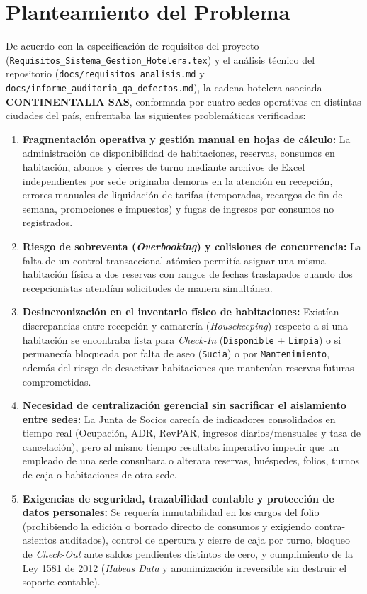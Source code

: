 \documentclass[12pt,a4paper]{article}
\begin{document}
\section{Planteamiento del Problema}

De acuerdo con la especificaci\'on de requisitos del proyecto (\texttt{Requisitos\_Sistema\_Gestion\_Hotelera.tex}) y el an\'alisis t\'ecnico del repositorio (\texttt{docs/requisitos\_analisis.md} y \texttt{docs/informe\_auditoria\_qa\_defectos.md}), la cadena hotelera asociada \textbf{CONTINENTALIA SAS}, conformada por cuatro sedes operativas en distintas ciudades del pa\'is, enfrentaba las siguientes problem\'aticas verificadas:

\begin{enumerate}
    \item \textbf{Fragmentaci\'on operativa y gesti\'on manual en hojas de c\'alculo:} La administraci\'on de disponibilidad de habitaciones, reservas, consumos en habitaci\'on, abonos y cierres de turno mediante archivos de Excel independientes por sede originaba demoras en la atenci\'on en recepci\'on, errores manuales de liquidaci\'on de tarifas (temporadas, recargos de fin de semana, promociones e impuestos) y fugas de ingresos por consumos no registrados.
    \item \textbf{Riesgo de sobreventa (\textit{Overbooking}) y colisiones de concurrencia:} La falta de un control transaccional at\'omico permit\'ia asignar una misma habitaci\'on f\'isica a dos reservas con rangos de fechas traslapados cuando dos recepcionistas atend\'ian solicitudes de manera simult\'anea.
    \item \textbf{Desincronizaci\'on en el inventario f\'isico de habitaciones:} Exist\'ian discrepancias entre recepci\'on y camarer\'ia (\textit{Housekeeping}) respecto a si una habitaci\'on se encontraba lista para \textit{Check-In} (\texttt{Disponible} + \texttt{Limpia}) o si permanec\'ia bloqueada por falta de aseo (\texttt{Sucia}) o por \texttt{Mantenimiento}, adem\'as del riesgo de desactivar habitaciones que manten\'ian reservas futuras comprometidas.
    \item \textbf{Necesidad de centralizaci\'on gerencial sin sacrificar el aislamiento entre sedes:} La Junta de Socios carec\'ia de indicadores consolidados en tiempo real (Ocupaci\'on, ADR, RevPAR, ingresos diarios/mensuales y tasa de cancelaci\'on), pero al mismo tiempo resultaba imperativo impedir que un empleado de una sede consultara o alterara reservas, hu\'espedes, folios, turnos de caja o habitaciones de otra sede.
    \item \textbf{Exigencias de seguridad, trazabilidad contable y protecci\'on de datos personales:} Se requer\'ia inmutabilidad en los cargos del folio (prohibiendo la edici\'on o borrado directo de consumos y exigiendo contra-asientos auditados), control de apertura y cierre de caja por turno, bloqueo de \textit{Check-Out} ante saldos pendientes distintos de cero, y cumplimiento de la Ley 1581 de 2012 (\textit{Habeas Data} y anonimizaci\'on irreversible sin destruir el soporte contable).
\end{enumerate}
\end{document}
